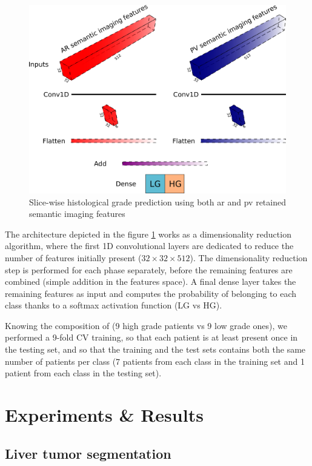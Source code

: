 \begin{figure}[!ht]
	\centering
	\includegraphics[width=0.9\linewidth]{../HistologicalGradePrediction/images/gradpredictionArchitecture}
	\caption{Slice-wise histological grade prediction using both \ac{ar} and \ac{pv} retained semantic imaging features}
	\label{fig:gradpredictionArchitecture}
\end{figure}

The architecture depicted in the figure \ref{fig:gradpredictionArchitecture} works as a dimensionality
reduction algorithm, where the first 1D convolutional layers are dedicated to
reduce the number of features initially present ($ 32\times32\times512 $). The
dimensionality reduction step is performed for each phase separately,
before the remaining features are combined (simple addition in the
features space).
A final dense layer takes the remaining features as input and computes
the probability of belonging to each class thanks to a softmax activation
function (LG vs HG).

Knowing the composition of \textbf{} (9 high grade patients vs 9 low
grade ones), we performed a 9-fold CV training, so that each patient is
at least present once in the testing set, and so that the training and
the test sets contains both the same number of patients per
class (7 patients from each class in the training set and 1 patient from
each class in the testing set).

\section{Experiments \& Results}


\subsection{Liver tumor segmentation}

